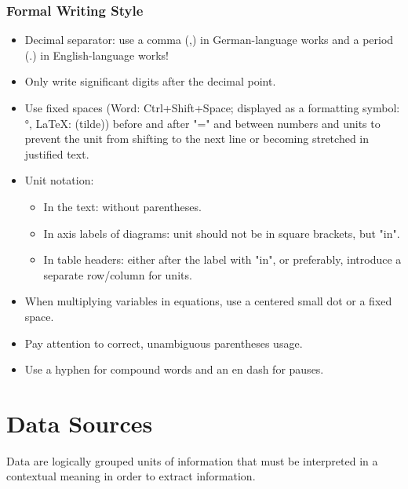\documentclass[a4paper, fleqn, headsepline, footsepline, 12pt, parskip=half]{scrartcl}
\begin{document}
\subsubsection{Formal Writing Style}
\label{sec:formal_writing_style}

\begin{itemize}
    \item Decimal separator: use a comma (,) in German-language works and a period (.) in English-language works!
    \item Only write significant digits after the decimal point.
    \item Use fixed spaces (Word: Ctrl+Shift+Space; displayed as a formatting symbol: °, LaTeX: \raisebox{-0.8ex}{\~{}} (tilde)) before and after "=" and between numbers and units to prevent the unit from shifting to the next line or becoming stretched in justified text.
    \item Unit notation:
    \begin{itemize}
        \item In the text: without parentheses.
        \item In axis labels of diagrams: unit should not be in square brackets, but "in".
        \item In table headers: either after the label with "in", or preferably, introduce a separate row/column for units.
    \end{itemize}
    \item When multiplying variables in equations, use a centered small dot or a fixed space.
    \item Pay attention to correct, unambiguous parentheses usage.
    \item Use a hyphen for compound words and an en dash for pauses.
\end{itemize}



\newpage
\section{Data Sources}
\label{sec:dataSources}

Data are logically grouped units of information that must be interpreted in a contextual meaning in order to extract information.
\end{document}

